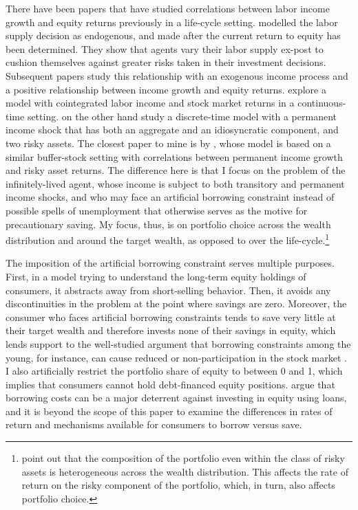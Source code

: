 There have been papers that have studied correlations between labor income growth and equity returns previously in a life-cycle setting. \citet{Bodie1992} modelled the labor supply decision as endogenous, and made after the current return to equity has been determined. They show that agents vary their labor supply ex-post to cushion themselves against greater risks taken in their investment decisions. Subsequent papers study this relationship with an exogenous income process and a positive relationship between income growth and equity returns. \citet{Benzoni2007} explore a model with cointegrated labor income and stock market returns in a continuous-time setting. \citet{Bagliano2014} on the other hand study a discrete-time model with a permanent income shock that has both an aggregate and an idiosyncratic component, and two risky assets. The closest paper to mine is by \citet{Viceira2001}, whose model is based on a similar buffer-stock setting with correlations between permanent income growth and risky asset returns. The difference here is that I focus on the problem of the infinitely-lived agent, whose income is subject to both transitory and permanent income shocks, and who may face an artificial borrowing constraint instead of possible spells of unemployment that otherwise serves as the motive for precautionary saving. My focus, thus, is on portfolio choice across the wealth distribution and around the target wealth, as opposed to over the life-cycle.\footnote{\citet{Fagereng2020} point out that the composition of the portfolio even within the class of risky assets is heterogeneous across the wealth distribution. This affects the rate of return on the risky component of the portfolio, which, in turn, also affects portfolio choice.}

The imposition of the artificial borrowing constraint serves multiple purposes. First, in a model trying to understand the long-term equity holdings of consumers, it abstracts away from short-selling behavior. Then, it avoids any discontinuities in the problem at the point where savings are zero. Moreover, the consumer who faces artificial borrowing constraints tends to save very little at their target wealth and therefore invests none of their savings in equity, which lends support to the well-studied argument that borrowing constraints among the young, for instance, can cause reduced or non-participation in the stock market \citep{Constantinides2002, Haliassos2002, Kogan2007, Jang2015, Harenberg2018}. I also artificially restrict the portfolio share of equity to between 0 and 1, which implies that consumers cannot hold debt-financed equity positions. \citet{Davis2006} argue that borrowing costs can be a major deterrent against investing in equity using loans, and it is beyond the scope of this paper to examine the differences in rates of return and mechanisms available for consumers to borrow versus save.

